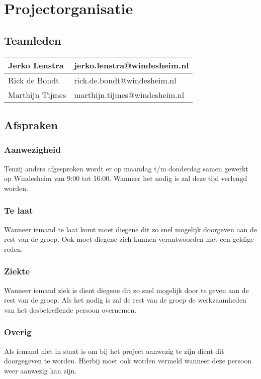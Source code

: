 \section{Projectorganisatie}
\subsection{Teamleden}
\begin{tabularx}{\textwidth}{| X | X |}
	\hline
	Jerko Lenstra & jerko.lenstra@windesheim.nl \\ \hline
	Rick de Bondt & rick.de.bondt@windesheim.nl \\ \hline
	Marthijn Tijmes & marthijn.tijmes@windesheim.nl \\
	\hline
\end{tabularx}

\subsection{Afspraken}
\subsubsection{Aanwezigheid} 
Tenzij anders afgesproken wordt er op maandag t/m donderdag samen gewerkt op Windesheim van 9:00 tot 
16:00. Wanneer het nodig is zal deze tijd verlengd worden.

\subsubsection{Te laat}
Wanneer iemand te laat komt moet diegene dit zo snel mogelijk doorgeven aan 
de rest van de groep. Ook moet diegene zich kunnen verantwoorden met een 
geldige reden.

\subsubsection{Ziekte}
Wanneer iemand ziek is dient diegene dit zo snel mogelijk door te geven aan
de rest van de groep. Als het nodig is zal de rest van de groep de werkzaamheden
van het desbetreffende persoon overnemen. 

\subsubsection{Overig}
Als iemand niet in staat is om bij het project aanwezig te zijn dient dit doorgegeven
te worden. Hierbij moet ook worden vermeld wanneer deze persoon weer aanwezig kan 
zijn.
